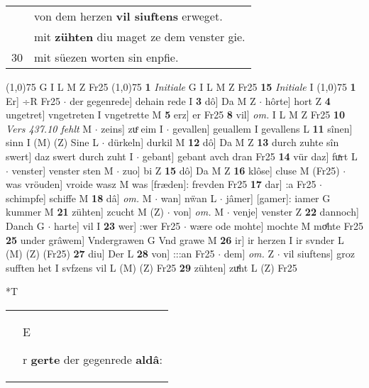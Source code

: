 \documentclass[8pt,a4paper,notitlepage]{article}
\begin{document}
\begin{table}[ht]
\begin{minipage}[t]{0.5\linewidth}
\begin{tabular}{rl}
 & von dem herzen \textbf{vil siuftens} erweget.\\ 
 & mit \textbf{zühten} diu maget ze dem venster gie.\\ 
30 & mit süezen worten sin enpfie.\\ 
\end{tabular}
\scriptsize
\line(1,0){75} \newline
G I L M Z Fr25 \newline
\line(1,0){75} \newline
\textbf{1} \textit{Initiale} G I L M Z Fr25  \textbf{15} \textit{Initiale} I  \newline
\line(1,0){75} \newline
\textbf{1} Er] ÷R Fr25  $\cdot$ der gegenrede] dehain rede I \textbf{3} dô] Da M Z  $\cdot$ hôrte] hort Z \textbf{4} ungetret] vngetreten I vngetrette M \textbf{5} erz] er Fr25 \textbf{8} vil] \textit{om.} I L M Z Fr25 \textbf{10} \textit{Vers 437.10 fehlt} M   $\cdot$ zeins] zuͤ eim I  $\cdot$ gevallen] geuallem I gevallens L \textbf{11} sînen] sinn I (M) (Z) Sine L  $\cdot$ dürkeln] durkil M \textbf{12} dô] Da M Z \textbf{13} durch zuhte sîn swert] daz swert durch zuht I  $\cdot$ gebant] gebant avch dran Fr25 \textbf{14} vür daz] fuͯrt L  $\cdot$ venster] venster sten M  $\cdot$ zuo] bi Z \textbf{15} dô] Da M Z \textbf{16} klôse] cluse M (Fr25)  $\cdot$ was vröuden] vroide wasz M was [fræden]: frevden Fr25 \textbf{17} dar] :a Fr25  $\cdot$ schimpfe] schiffe M \textbf{18} dâ] \textit{om.} M  $\cdot$ wan] nẅan L  $\cdot$ jâmer] [gamer]: iamer G kummer M \textbf{21} zühten] zcucht M (Z)  $\cdot$ von] \textit{om.} M  $\cdot$ venje] venster Z \textbf{22} dannoch] Danch G  $\cdot$ harte] vil I \textbf{23} wer] :wer Fr25  $\cdot$ wære ode mohte] mochte M moͤhte Fr25 \textbf{25} under grâwem] Vndergrawen G Vnd grawe M \textbf{26} ir] ir herzen I ir svnder L (M) (Z) (Fr25) \textbf{27} diu] Der L \textbf{28} von] :::an Fr25  $\cdot$ dem] \textit{om.} Z  $\cdot$ vil siuftens] groz sufften het I svfzens vil L (M) (Z) Fr25 \textbf{29} zühten] zuͯht L (Z) Fr25 \newline
\end{minipage}
\hspace{0.5cm}
\begin{minipage}[t]{0.5\linewidth}
\small
\begin{center}*T
\end{center}
\begin{tabular}{rl}
 & \begin{large}E\end{large}r \textbf{gerte} der gegenrede \textbf{aldâ}:\\ 

\end{tabular}
\end{minipage}
\end{table}
\end{document}
